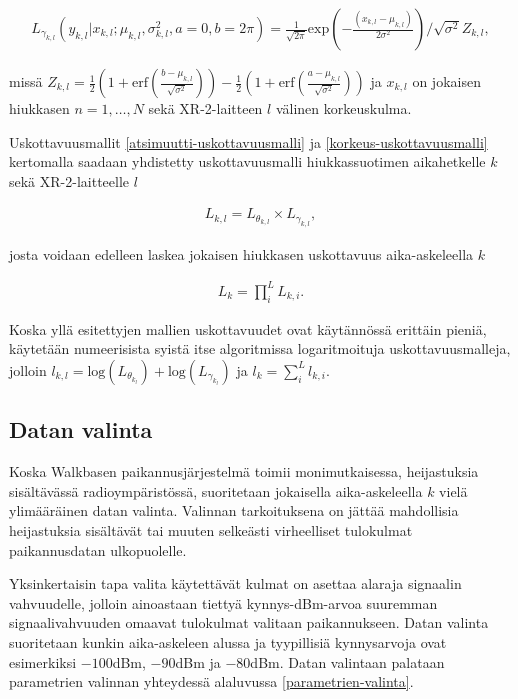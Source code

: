 \documentclass[
  12pt,
  a4paper, twoside]{book}
\begin{document}
\begin{align}\label{korkeus-uskottavuusmalli}
L_{\gamma_{k,l}}(y_{k,l}|x_{k,l}; \mu_{k,l}, \sigma^2_{k,l}, a=0, b=2 \pi)=\frac{1}{\sqrt{2 \pi}} \text{exp}(-\frac{(x_{k, l}-\mu_{k, l})}{2 \sigma^2}) / \sqrt{\sigma^2}Z_{k,l},
\end{align}

missä \(Z_{k,l}=\frac{1}{2}(1+\text{erf}(\frac{b-\mu_{k,l}}{\sqrt{\sigma^2}}))-\frac{1}{2}(1+\text{erf}(\frac{a-\mu_{k,l}}{\sqrt{\sigma^2}}))\) ja \(x_{k,l}\) on jokaisen hiukkasen \(n=1,\ldots,N\) sekä XR-2-laitteen \(l\) välinen korkeuskulma.

Uskottavuusmallit \ref{atsimuutti-uskottavuusmalli} ja \ref{korkeus-uskottavuusmalli} kertomalla saadaan yhdistetty uskottavuusmalli hiukkassuotimen aikahetkelle \(k\) sekä XR-2-laitteelle \(l\)

\begin{align}\label{yhdistetty-uskottavuusmalli}
L_{k,l}=L_{\theta_{k,l}} \times L_{\gamma_{k,l}},
\end{align}

josta voidaan edelleen laskea jokaisen hiukkasen uskottavuus aika-askeleella \(k\)

\begin{align}\label{lopullinen-uskottavuusmalli}
L_{k}=\prod_i^L L_{{k,i}}.
\end{align}

Koska yllä esitettyjen mallien uskottavuudet ovat käytännössä erittäin pieniä, käytetään numeerisista syistä itse algoritmissa logaritmoituja uskottavuusmalleja, jolloin \(l_{k,l} = \text{log}(L_{\theta_{k_l}}) + \text{log}(L_{\gamma_{k_l}})\) ja \(l_k = \sum_i^L l_{k,i}\).

\hypertarget{datan-valinta}{%
\subsection{Datan valinta}\label{datan-valinta}}

Koska Walkbasen paikannusjärjestelmä toimii monimutkaisessa, heijastuksia sisältävässä radioympäristössä, suoritetaan jokaisella aika-askeleella \(k\) vielä ylimääräinen datan valinta. Valinnan tarkoituksena on jättää mahdollisia heijastuksia sisältävät tai muuten selkeästi virheelliset tulokulmat paikannusdatan ulkopuolelle.

Yksinkertaisin tapa valita käytettävät kulmat on asettaa alaraja signaalin vahvuudelle, jolloin ainoastaan tiettyä kynnys-dBm-arvoa suuremman signaalivahvuuden omaavat tulokulmat valitaan paikannukseen. Datan valinta suoritetaan kunkin aika-askeleen alussa ja tyypillisiä kynnysarvoja ovat esimerkiksi \(-100\)dBm, \(-90\)dBm ja \(-80\)dBm. Datan valintaan palataan parametrien valinnan yhteydessä alaluvussa \ref{parametrien-valinta}.
\end{document}
